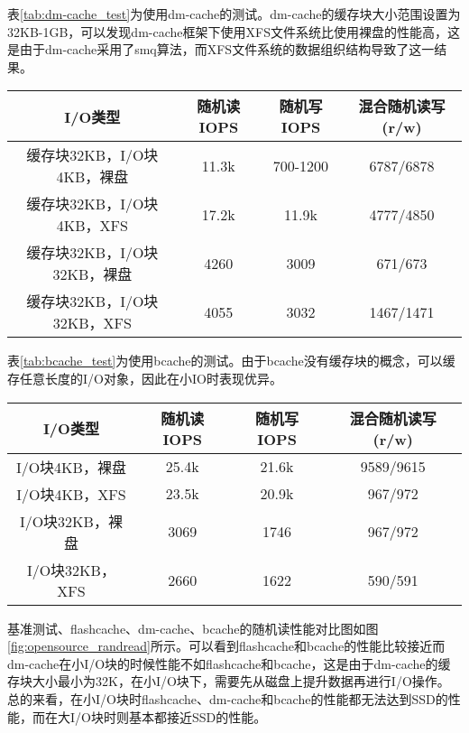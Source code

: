 表\ref{tab:dm-cache_test}为使用dm-cache的测试。dm-cache的缓存块大小范围设置为32KB-1GB，可以发现dm-cache框架下使用XFS文件系统比使用裸盘的性能高，这是由于dm-cache采用了smq算法，而XFS文件系统的数据组织结构导致了这一结果。 

\begin{table}[H]
    \centering
    \begin{tabular}{cccc} 
      \toprule
      I/O类型 & 随机读IOPS & 随机写IOPS & 混合随机读写(r/w) \\ 
      \midrule
      缓存块32KB，I/O块4KB，裸盘 & 11.3k & 700-1200 & 6787/6878 \\
      缓存块32KB，I/O块4KB，XFS & 17.2k & 11.9k & 4777/4850 \\
      缓存块32KB，I/O块32KB，裸盘 & 4260 & 3009 & 671/673 \\
      缓存块32KB，I/O块32KB，XFS & 4055 & 3032 & 1467/1471 \\
      \bottomrule
    \end{tabular}
\end{table}

表\ref{tab:bcache_test}为使用bcache的测试。由于bcache没有缓存块的概念，可以缓存任意长度的I/O对象，因此在小IO时表现优异。

\begin{table}[H]
    \centering
    \begin{tabular}{cccc} 
      \toprule
      I/O类型 & 随机读IOPS & 随机写IOPS & 混合随机读写(r/w) \\ 
      \midrule
      I/O块4KB，裸盘 & 25.4k & 21.6k & 9589/9615 \\
      I/O块4KB，XFS & 23.5k & 20.9k & 967/972 \\
      I/O块32KB，裸盘 & 3069 & 1746 & 967/972 \\
      I/O块32KB，XFS & 2660 & 1622 & 590/591 \\
      \bottomrule
    \end{tabular}
\end{table}

基准测试、flashcache、dm-cache、bcache的随机读性能对比图如图\ref{fig:opensource_randread}所示。可以看到flashcache和bcache的性能比较接近而dm-cache在小I/O块的时候性能不如flashcache和bcache，这是由于dm-cache的缓存块大小最小为32K，在小I/O块下，需要先从磁盘上提升数据再进行I/O操作。总的来看，在小I/O块时flashcache、dm-cache和bcache的性能都无法达到SSD的性能，而在大I/O块时则基本都接近SSD的性能。

